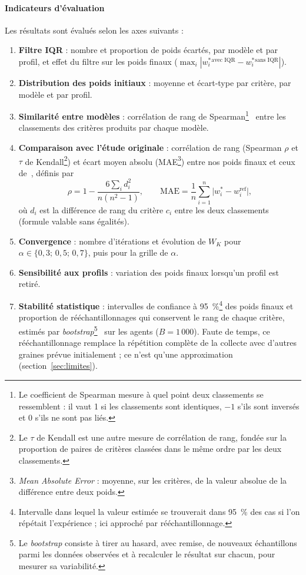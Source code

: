 \documentclass[11pt,a4paper]{article}
\begin{document}
\paragraph{Indicateurs d'évaluation} Les résultats sont évalués selon les axes suivants :
\begin{enumerate}[label=\arabic*.,start=0,leftmargin=*]
  \item \textbf{Filtre IQR} : nombre et proportion de poids écartés, par modèle et par profil, et effet du filtre sur les poids finaux ($\max_i|w^*_i{}^{\text{avec IQR}}-w^*_i{}^{\text{sans IQR}}|$).
  \item \textbf{Distribution des poids initiaux} : moyenne et écart-type par critère, par modèle et par profil.
  \item \textbf{Similarité entre modèles} : corrélation de rang de Spearman\footnote{Le coefficient de Spearman mesure à quel point deux classements se ressemblent : il vaut 1 si les classements sont identiques, $-1$ s'ils sont inversés et 0 s'ils ne sont pas liés.}~\cite{spearman} entre les classements des critères produits par chaque modèle.
  \item \textbf{Comparaison avec l'étude originale} : corrélation de rang (Spearman $\rho$ et $\tau$ de Kendall\footnote{Le $\tau$ de Kendall est une autre mesure de corrélation de rang, fondée sur la proportion de paires de critères classées dans le même ordre par les deux classements.}) et écart moyen absolu (MAE\footnote{\emph{Mean Absolute Error} : moyenne, sur les critères, de la valeur absolue de la différence entre deux poids.}) entre nos poids finaux et ceux de~\cite{vahidnia}, définis par
  \begin{equation}\label{eq:spearman}
    \rho=1-\frac{6\sum_i d_i^2}{n(n^2-1)},\qquad \mathrm{MAE}=\frac{1}{n}\sum_{i=1}^{n}\bigl|w_i^*-w_i^{\mathrm{ref}}\bigr|,
  \end{equation}
  où $d_i$ est la différence de rang du critère $c_i$ entre les deux classements (formule valable sans égalités).
  \item \textbf{Convergence} : nombre d'itérations et évolution de $W_K$ pour $\alpha\in\{0{,}3;\,0{,}5;\,0{,}7\}$, puis pour la grille de $\alpha$.
  \item \textbf{Sensibilité aux profils} : variation des poids finaux lorsqu'un profil est retiré.
  \item \textbf{Stabilité statistique} : intervalles de confiance à 95~\%\footnote{Intervalle dans lequel la valeur estimée se trouverait dans 95~\% des cas si l'on répétait l'expérience ; ici approché par rééchantillonnage.} des poids finaux et proportion de rééchantillonnages qui conservent le rang de chaque critère, estimés par \emph{bootstrap}\footnote{Le \emph{bootstrap} consiste à tirer au hasard, avec remise, de nouveaux échantillons parmi les données observées et à recalculer le résultat sur chacun, pour mesurer sa variabilité.}~\cite{efron} sur les agents ($B=1\,000$). Faute de temps, ce rééchantillonnage remplace la répétition complète de la collecte avec d'autres graines prévue initialement ; ce n'est qu'une approximation (section~\ref{sec:limites}).

\end{enumerate}
\end{document}
